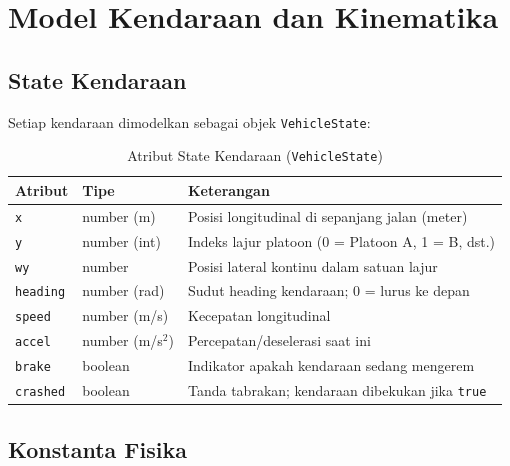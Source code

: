 \documentclass[12pt,a4paper]{article}
\begin{document}
\section{Model Kendaraan dan Kinematika}

\subsection{State Kendaraan}

Setiap kendaraan dimodelkan sebagai objek \texttt{VehicleState}:

\begin{table}[ht]
\centering
\caption{Atribut State Kendaraan (\texttt{VehicleState})}
\begin{tabularx}{\linewidth}{llX}
\toprule
\textbf{Atribut} & \textbf{Tipe} & \textbf{Keterangan} \\
\midrule
\texttt{x}       & number (m) & Posisi longitudinal di sepanjang jalan (meter) \\
\texttt{y}       & number (int) & Indeks lajur platoon (0 = Platoon A, 1 = B, dst.) \\
\texttt{wy}      & number & Posisi lateral kontinu dalam satuan lajur \\
\texttt{heading} & number (rad) & Sudut heading kendaraan; 0 = lurus ke depan \\
\texttt{speed}   & number (m/s) & Kecepatan longitudinal \\
\texttt{accel}   & number (m/s$^{2}$) & Percepatan/deselerasi saat ini \\
\texttt{brake}   & boolean & Indikator apakah kendaraan sedang mengerem \\
\texttt{crashed} & boolean & Tanda tabrakan; kendaraan dibekukan jika \texttt{true} \\
\bottomrule
\end{tabularx}
\end{table}

\subsection{Konstanta Fisika}
\end{document}
